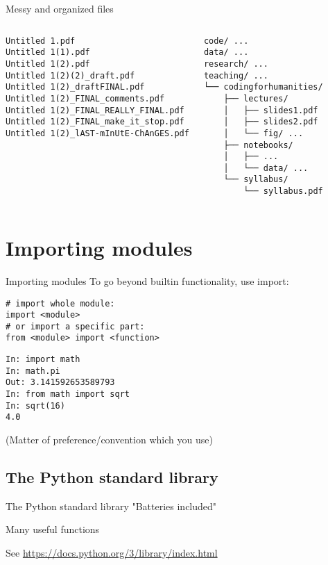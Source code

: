 \documentclass[aspectratio=169,usenames,dvipsnames]{beamer}
\begin{document}
\begin{frame}[fragile]{Messy and organized files}
\begin{columns}
\begin{verbatim}
Untitled 1.pdf
Untitled 1(1).pdf
Untitled 1(2).pdf
Untitled 1(2)(2)_draft.pdf
Untitled 1(2)_draftFINAL.pdf
Untitled 1(2)_FINAL_comments.pdf
Untitled 1(2)_FINAL_REALLY_FINAL.pdf
Untitled 1(2)_FINAL_make_it_stop.pdf
Untitled 1(2)_lAST-mInUtE-ChAnGES.pdf
\end{verbatim}
\pause
{}
\begin{verbatim}
code/ ...
data/ ...
research/ ...
teaching/ ...
└── codingforhumanities/
    ├── lectures/
    │   ├── slides1.pdf
    │   ├── slides2.pdf
    │   └── fig/ ...
    ├── notebooks/
    │   ├── ...
    │   └── data/ ...
    └── syllabus/
        └── syllabus.pdf
\end{verbatim}
\end{columns}
\end{frame}


\section{Importing modules}
\frame{\tableofcontents[currentsection]}

\begin{frame}[fragile]{Importing modules}
To go beyond builtin functionality, use import:
\begin{lstlisting}
# import whole module:
import <module>
# or import a specific part:
from <module> import <function>
\end{lstlisting}

\pause
\begin{lstlisting}
In: import math
In: math.pi
Out: 3.141592653589793
In: from math import sqrt
In: sqrt(16)
4.0
\end{lstlisting}

(Matter of preference/convention which you use)
\end{frame}

\subsection{The Python standard library}
\begin{frame}[fragile]{The Python standard library}
	"Batteries included"

	\vspace{1em}
	Many useful functions

	\vspace{1em}
    See \url{https://docs.python.org/3/library/index.html}
\end{frame}
\end{document}
